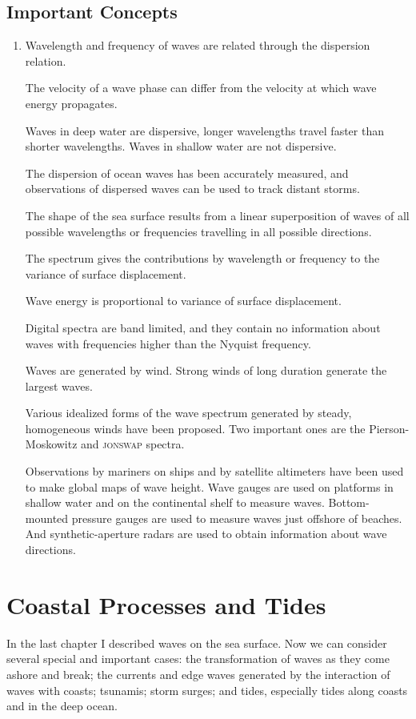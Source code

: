 \section{Important Concepts}
\begin{enumerate}
\item Wavelength and frequency of waves are related through the
dispersion relation.

\vitem The velocity of a wave phase can differ from the velocity at
which wave energy propagates.

\vitem Waves in deep water are dispersive, longer wavelengths travel
faster than shorter wavelengths. Waves in shallow water are not
dispersive.

\vitem The dispersion of ocean waves has been accurately measured, and
observations of dispersed waves can be used to track distant storms.

\vitem The shape of the sea surface results from a linear
superposition of waves of all possible wavelengths or frequencies
travelling in all possible directions.

\vitem The spectrum gives the contributions by wavelength or frequency
to the variance of surface displacement.

\vitem Wave energy is proportional to variance of surface
displacement.

\vitem Digital spectra are band limited, and they contain no
information about waves with frequencies higher than the Nyquist
frequency.

\vitem Waves are generated by wind. Strong winds of long duration
generate the largest waves.

\vitem Various idealized forms of the wave spectrum generated by
steady, homogeneous winds have been proposed. Two important ones are
the Pierson-Moskowitz and \textsc{jonswap} spectra.

\vitem Observations by mariners on ships and by satellite altimeters
have been used to make global maps of wave height. Wave gauges are
used on platforms in shallow water and on the continental shelf to
measure waves. Bottom-mounted pressure gauges are used to measure
waves just offshore of beaches. And synthetic-aperture radars are used
to obtain information about wave directions.
\end{enumerate}


\chapter{Coastal Processes and Tides}
\addtocounter{figure}{1} In the last chapter I described waves on the
sea surface. Now we can consider several special and important cases:
the transformation of waves as they come ashore and break; the
currents and edge waves generated by the interaction of waves with
coasts; tsunamis; storm surges; and tides, especially
tides along coasts and in the deep ocean.

